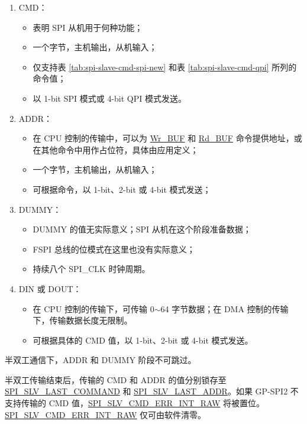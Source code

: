 \documentclass[main\_\_CN.tex]{subfiles}
\begin{document}
\begin{enumerate}
   \item CMD：
        \begin{itemize}
            \item 表明 SPI 从机用于何种功能；
            \item 一个字节，主机输出，从机输入；
            \item 仅支持表 \ref{tab:spi-slave-cmd-spi-new} 和表 \ref{tab:spi-slave-cmd-qpi} 所列的命令值；
            \item 以 1-bit SPI 模式或 4-bit QPI 模式发送。
        \end{itemize}

   \item ADDR：
        \begin{itemize}
            \item 在 CPU 控制的传输中，可以为  \hyperlink{cmd:wrbuf}{Wr\_BUF} 和  \hyperlink{cmd:rdbuf}{Rd\_BUF} 命令提供地址，或在其他命令中用作占位符，具体由应用定义；
            \item 一个字节，主机输出，从机输入；
            \item 可根据命令，以 1-bit、2-bit 或 4-bit 模式发送；
        \end{itemize}

   \item DUMMY：
        \begin{itemize}
            \item DUMMY 的值无实际意义；SPI 从机在这个阶段准备数据；
            \item FSPI 总线的位模式在这里也没有实际意义；
            \item 持续八个 SPI\_CLK 时钟周期。
        \end{itemize}

   \item DIN 或 DOUT：

        \begin{itemize}
            \item 在 CPU 控制的传输下，可传输 0$\sim$64 字节数据；在 DMA 控制的传输下，传输数据长度无限制。
            \item 可根据具体的 CMD 值，以 1-bit、2-bit 或 4-bit 模式发送。
        \end{itemize}

   \end{enumerate}

\begin{tiplisting}
半双工通信下，ADDR 和 DUMMY 阶段不可跳过。
\end{tiplisting}
\vspace{-1em}
半双工传输结束后，传输的 CMD 和 ADDR 的值分别锁存至 \hyperref[fielddesc:SPISLVLASTCOMMAND]{SPI\_SLV\_LAST\_COMMAND} 和 \hyperref[fielddesc:SPISLVLASTADDR]{SPI\_SLV\_LAST\_ADDR}。如果 GP-SPI2 不支持传输的 CMD 值，\hyperref[fielddesc:SPISLVCMDERRINTRAW]{SPI\_SLV\_CMD\_ERR\_INT\_RAW} 将被置位。 \hyperref[fielddesc:SPISLVCMDERRINTRAW]{SPI\_SLV\_CMD\_ERR\_INT\_RAW} 仅可由软件清零。
\end{document}
